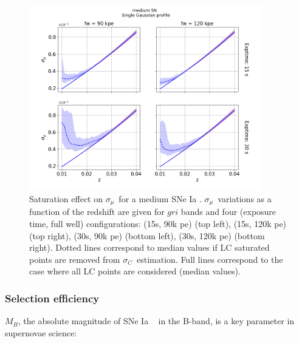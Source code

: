 \documentclass[\docopts]{\docclass}
\newcommand{\sne}{{SNe Ia }}
\newcommand{\pe}{{pe}}
\newcommand{\colorerr}{{$\sigma_C$}}
\newcommand{\sigmu}{{$\sigma_\mu$}}
\begin{document}
\begin{figure}[htbp]
\begin{center}
  \includegraphics[width=0.9\textwidth]{Sigma_mu_medium_single_gaussian.png}
 \caption{Saturation effect on \sigmu~for a medium \sne. \sigmu~variations as a function of the redshift are given for $gri$ bands and four (exposure time, full well) configurations: (15s, 90k \pe) (top left),  (15s, 120k \pe) (top right), (30s, 90k \pe) (bottom left),  (30s, 120k \pe) (bottom right). Dotted lines correspond to median values if LC saturated points are removed from \colorerr~estimation. Full lines correspond to the case where all LC points are considered (median values).}\label{fig:sigmamedium}
\end{center}
\end{figure}


\subsubsection{Selection efficiency}

$M_B$, the absolute magnitude of \sne~ in the B-band, is a key parameter in supernovae science: 
\end{document}
